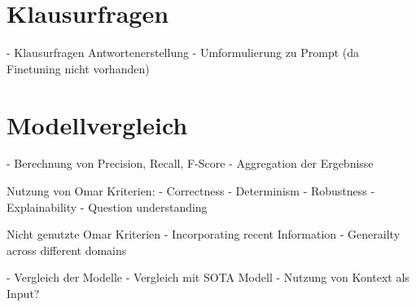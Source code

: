 \section{Klausurfragen}
- Klausurfragen Antwortenerstellung
- Umformulierung zu Prompt (da Finetuning nicht vorhanden)

\section{Modellvergleich}
- Berechnung von Precision, Recall, F-Score
- Aggregation der Ergebnisse

Nutzung von Omar Kriterien:
    - Correctness
    - Determinism
    - Robustness
    - Explainability
    - Question understanding

Nicht genutzte Omar Kriterien
    - Incorporating recent Information
    - Generailty across different domains
    
- Vergleich der Modelle
- Vergleich mit SOTA Modell
    - Nutzung von Kontext als Input?

